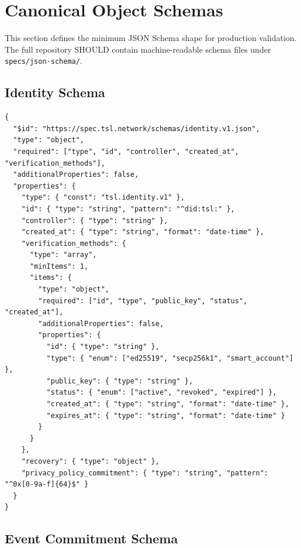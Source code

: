 \documentclass[11pt]{article}
\begin{document}
\section{Canonical Object Schemas}

This section defines the minimum JSON Schema shape for production validation. The full repository SHOULD contain machine-readable schema files under \texttt{specs/json-schema/}.

\subsection{Identity Schema}

\begin{lstlisting}[style=tslcode]
{
  "$id": "https://spec.tsl.network/schemas/identity.v1.json",
  "type": "object",
  "required": ["type", "id", "controller", "created_at", "verification_methods"],
  "additionalProperties": false,
  "properties": {
    "type": { "const": "tsl.identity.v1" },
    "id": { "type": "string", "pattern": "^did:tsl:" },
    "controller": { "type": "string" },
    "created_at": { "type": "string", "format": "date-time" },
    "verification_methods": {
      "type": "array",
      "minItems": 1,
      "items": {
        "type": "object",
        "required": ["id", "type", "public_key", "status", "created_at"],
        "additionalProperties": false,
        "properties": {
          "id": { "type": "string" },
          "type": { "enum": ["ed25519", "secp256k1", "smart_account"] },
          "public_key": { "type": "string" },
          "status": { "enum": ["active", "revoked", "expired"] },
          "created_at": { "type": "string", "format": "date-time" },
          "expires_at": { "type": "string", "format": "date-time" }
        }
      }
    },
    "recovery": { "type": "object" },
    "privacy_policy_commitment": { "type": "string", "pattern": "^0x[0-9a-f]{64}$" }
  }
}
\end{lstlisting}

\subsection{Event Commitment Schema}
\end{document}
